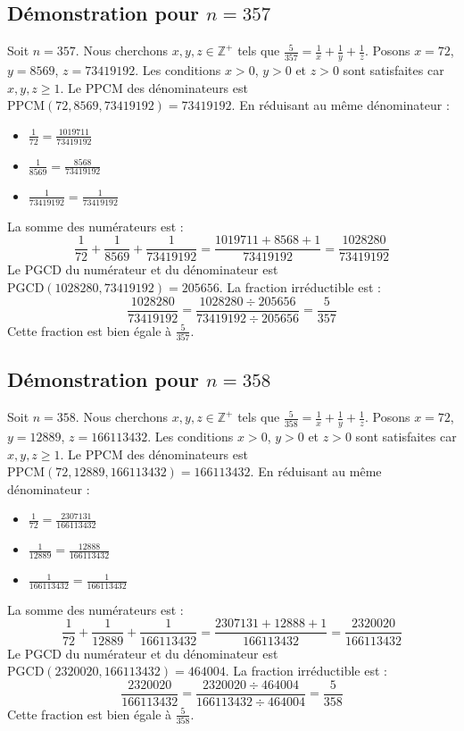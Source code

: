 \documentclass[11pt,a4paper]{article}
\begin{document}
\subsection{Démonstration pour $n = 357$}
Soit $n = 357$. Nous cherchons $x, y, z \in \mathbb{Z}^{+}$ tels que $\frac{5}{357} = \frac{1}{x} + \frac{1}{y} + \frac{1}{z}$.
Posons $x = 72$, $y = 8569$, $z = 73419192$.
Les conditions $x > 0$, $y > 0$ et $z > 0$ sont satisfaites car $x, y, z \geq 1$.
Le PPCM des dénominateurs est $\text{PPCM}(72, 8569, 73419192) = 73419192$.
En réduisant au même dénominateur :
\begin{itemize}
    \item $\frac{1}{72} = \frac{1019711}{73419192}$
    \item $\frac{1}{8569} = \frac{8568}{73419192}$
    \item $\frac{1}{73419192} = \frac{1}{73419192}$
\end{itemize}
La somme des numérateurs est :
$$ \frac{1}{72} + \frac{1}{8569} + \frac{1}{73419192} = \frac{1019711 + 8568 + 1}{73419192} = \frac{1028280}{73419192} $$
Le PGCD du numérateur et du dénominateur est $\text{PGCD}(1028280, 73419192) = 205656$.
La fraction irréductible est :
$$ \frac{1028280}{73419192} = \frac{1028280 \div 205656}{73419192 \div 205656} = \frac{5}{357} $$
Cette fraction est bien égale à $\frac{5}{357}$.

\subsection{Démonstration pour $n = 358$}
Soit $n = 358$. Nous cherchons $x, y, z \in \mathbb{Z}^{+}$ tels que $\frac{5}{358} = \frac{1}{x} + \frac{1}{y} + \frac{1}{z}$.
Posons $x = 72$, $y = 12889$, $z = 166113432$.
Les conditions $x > 0$, $y > 0$ et $z > 0$ sont satisfaites car $x, y, z \geq 1$.
Le PPCM des dénominateurs est $\text{PPCM}(72, 12889, 166113432) = 166113432$.
En réduisant au même dénominateur :
\begin{itemize}
    \item $\frac{1}{72} = \frac{2307131}{166113432}$
    \item $\frac{1}{12889} = \frac{12888}{166113432}$
    \item $\frac{1}{166113432} = \frac{1}{166113432}$
\end{itemize}
La somme des numérateurs est :
$$ \frac{1}{72} + \frac{1}{12889} + \frac{1}{166113432} = \frac{2307131 + 12888 + 1}{166113432} = \frac{2320020}{166113432} $$
Le PGCD du numérateur et du dénominateur est $\text{PGCD}(2320020, 166113432) = 464004$.
La fraction irréductible est :
$$ \frac{2320020}{166113432} = \frac{2320020 \div 464004}{166113432 \div 464004} = \frac{5}{358} $$
Cette fraction est bien égale à $\frac{5}{358}$.
\end{document}
